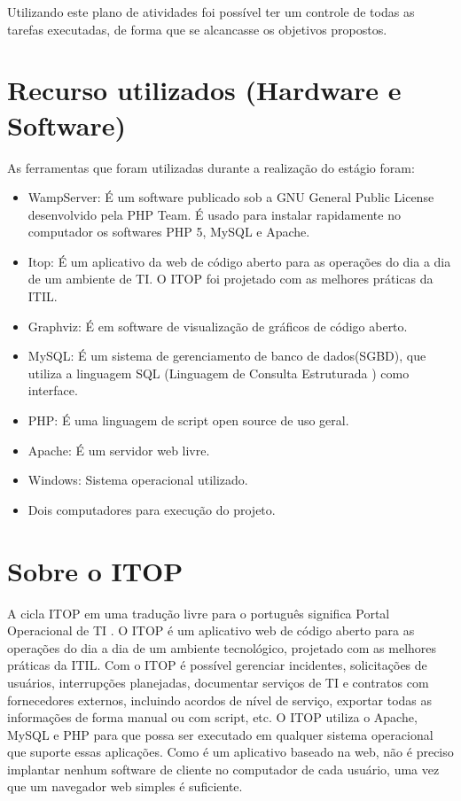 \documentclass[eso]{bcc}
\begin{document}
Utilizando este plano de atividades foi possível ter um controle de todas as tarefas executadas, de forma que se alcancasse os objetivos propostos.




\section{Recurso utilizados (Hardware e Software)}

As ferramentas que foram utilizadas durante a realização do estágio foram:
\begin{itemize}
\item WampServer: É um software publicado sob a GNU General Public License desenvolvido pela PHP Team. É usado para instalar rapidamente no computador os softwares PHP 5, MySQL e Apache.
\item Itop: É um aplicativo da web de código aberto para as operações do dia a dia de um ambiente de TI. O ITOP foi projetado com as melhores práticas da ITIL. 
\item Graphviz: É em software de visualização de gráficos de código aberto.
\item MySQL: É um sistema de gerenciamento de banco de dados(SGBD), que utiliza a linguagem SQL (Linguagem de Consulta Estruturada ) como interface.
\item PHP: É uma linguagem de script open source de uso geral.
\item Apache: É um servidor web livre.
\item Windows: Sistema operacional utilizado.
\item Dois computadores para execução do projeto.
\end{itemize}
\section{Sobre o ITOP}

A cicla ITOP em uma tradução livre para o português significa Portal Operacional de TI . O ITOP é um aplicativo web de código aberto para as operações do dia a dia de um ambiente tecnológico, projetado com as melhores práticas da ITIL.
Com o ITOP é possível gerenciar incidentes, solicitações de usuários, interrupções planejadas, documentar serviços de TI e contratos com fornecedores externos, incluindo acordos de nível de serviço, exportar todas as informações de forma manual ou com script, etc.
O ITOP utiliza o Apache, MySQL e PHP para que possa ser executado em qualquer sistema operacional que suporte essas aplicações. Como é um aplicativo baseado na web, não é preciso implantar nenhum software de cliente no computador de cada usuário, uma vez que um navegador web simples é suficiente.
\end{document}
